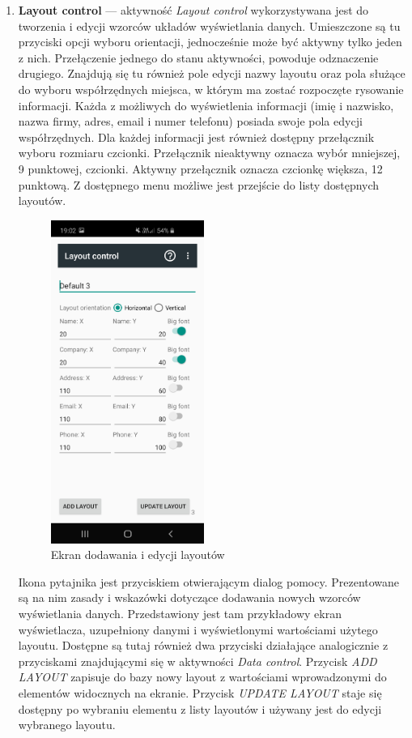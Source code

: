 \documentclass[a4paper,12pt, twoside]{article}
\begin{document}
\begin{enumerate}
    	   \item \textbf{Layout control} — aktywność \textit{Layout control} wykorzystywana jest do tworzenia i edycji wzorców układów wyświetlania danych. Umieszczone są tu przyciski opcji wyboru orientacji, jednocześnie może być aktywny tylko jeden z nich. Przełączenie jednego do stanu aktywności, powoduje odznaczenie drugiego. Znajdują się tu również pole edycji nazwy layoutu oraz pola służące do wyboru współrzędnych miejsca, w którym ma zostać rozpoczęte rysowanie informacji. Każda z możliwych do wyświetlenia informacji (imię i nazwisko, nazwa firmy, adres, email i numer telefonu) posiada swoje pola edycji współrzędnych. Dla każdej informacji jest również dostępny przełącznik wyboru rozmiaru czcionki. Przełącznik nieaktywny oznacza wybór mniejszej, 9 punktowej, czcionki. Aktywny przełącznik oznacza czcionkę większa, 12 punktową. Z dostępnego menu możliwe jest przejście do listy dostępnych layoutów. 
    	   \begin{figure}[H]
    	        \centering
    	        \includegraphics[width=5cm]{images/view_layoutEdit.jpg}
    			\caption{ Ekran dodawania i edycji layoutów}
                \label{fig:layoutControl}
    	   \end{figure}
    	   Ikona pytajnika jest przyciskiem otwierającym dialog pomocy. Prezentowane są na nim zasady i wskazówki dotyczące dodawania nowych wzorców wyświetlania danych. Przedstawiony jest tam przykładowy ekran wyświetlacza, uzupełniony danymi i wyświetlonymi wartościami użytego layoutu.
    	   Dostępne są tutaj również dwa przyciski działające analogicznie z przyciskami znajdującymi się w aktywności \textit{Data control}. Przycisk \textit{ADD LAYOUT} zapisuje do bazy nowy layout z wartościami wprowadzonymi do elementów widocznych na ekranie. Przycisk \textit{UPDATE LAYOUT} staje się dostępny po wybraniu elementu z listy layoutów i używany jest do edycji wybranego layoutu.
    	   

\end{enumerate}
\end{document}
